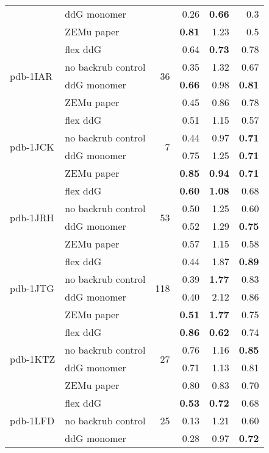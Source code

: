 {\begin{longtable}{llrrrr}
 & ddG monomer & & 0.26 & \textbf{0.66} & 0.3  \\
 & ZEMu paper & & \textbf{0.81} & 1.23 & 0.5  \\
\hline
 \multirow{ 4}{*}{pdb-1IAR} & flex ddG & \multirow{ 4}{*}{36} & 0.64 & \textbf{0.73} & 0.78  \\
 & no backrub control & & 0.35 & 1.32 & 0.67  \\
 & ddG monomer & & \textbf{0.66} & 0.98 & \textbf{0.81}  \\
 & ZEMu paper & & 0.45 & 0.86 & 0.78  \\
\hline
 \multirow{ 4}{*}{pdb-1JCK} & flex ddG & \multirow{ 4}{*}{7} & 0.51 & 1.15 & 0.57  \\
 & no backrub control & & 0.44 & 0.97 & \textbf{0.71}  \\
 & ddG monomer & & 0.75 & 1.25 & \textbf{0.71}  \\
 & ZEMu paper & & \textbf{0.85} & \textbf{0.94} & \textbf{0.71}  \\
\hline
 \multirow{ 4}{*}{pdb-1JRH} & flex ddG & \multirow{ 4}{*}{53} & \textbf{0.60} & \textbf{1.08} & 0.68  \\
 & no backrub control & & 0.50 & 1.25 & 0.60  \\
 & ddG monomer & & 0.52 & 1.29 & \textbf{0.75}  \\
 & ZEMu paper & & 0.57 & 1.15 & 0.58  \\
\hline
 \multirow{ 4}{*}{pdb-1JTG} & flex ddG & \multirow{ 4}{*}{118} & 0.44 & 1.87 & \textbf{0.89}  \\
 & no backrub control & & 0.39 & \textbf{1.77} & 0.83  \\
 & ddG monomer & & 0.40 & 2.12 & 0.86  \\
 & ZEMu paper & & \textbf{0.51} & \textbf{1.77} & 0.75  \\
\hline
 \multirow{ 4}{*}{pdb-1KTZ} & flex ddG & \multirow{ 4}{*}{27} & \textbf{0.86} & \textbf{0.62} & 0.74  \\
 & no backrub control & & 0.76 & 1.16 & \textbf{0.85}  \\
 & ddG monomer & & 0.71 & 1.13 & 0.81  \\
 & ZEMu paper & & 0.80 & 0.83 & 0.70  \\
\hline
 \multirow{ 4}{*}{pdb-1LFD} & flex ddG & \multirow{ 4}{*}{25} & \textbf{0.53} & \textbf{0.72} & 0.68  \\
 & no backrub control & & 0.13 & 1.21 & 0.60  \\
 & ddG monomer & & 0.28 & 0.97 & \textbf{0.72}  \\

\end{longtable}}
